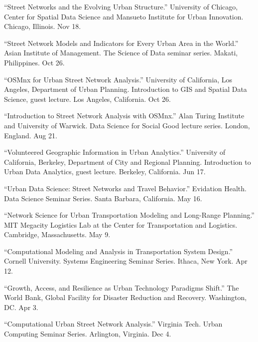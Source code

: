 \documentclass[11pt,letterpaper]{report} %
\begin{document}
\begin{tablist}
\item[2020] \tab{}\enquote{Street Networks and the Evolving Urban Structure.} University of Chicago, Center for Spatial Data Science and Mansueto Institute for Urban Innovation. Chicago, Illinois. Nov 18.

\item[2020] \tab{}\enquote{Street Network Models and Indicators for Every Urban Area in the World.} Asian Institute of Management. The Science of Data seminar series. Makati, Philippines. Oct 26.

\item[2020] \tab{}\enquote{OSMnx for Urban Street Network Analysis.} University of California, Los Angeles, Department of Urban Planning. Introduction to GIS and Spatial Data Science, guest lecture. Los Angeles, California. Oct 26.

\item[2020] \tab{}\enquote{Introduction to Street Network Analysis with OSMnx.} Alan Turing Institute and University of Warwick. Data Science for Social Good lecture series. London, England. Aug 21.

\item[2020] \tab{}\enquote{Volunteered Geographic Information in Urban Analytics.} University of California, Berkeley, Department of City and Regional Planning. Introduction to Urban Data Analytics, guest lecture. Berkeley, California. Jun 17.

\item[2019] \tab{}\enquote{Urban Data Science: Street Networks and Travel Behavior.} Evidation Health. Data Science Seminar Series. Santa Barbara, California. May 16.

\item[2019] \tab{}\enquote{Network Science for Urban Transportation Modeling and Long-Range Planning.} MIT Megacity Logistics Lab at the Center for Transportation and Logistics. Cambridge, Massachusetts. May 9.

\item[2019] \tab{}\enquote{Computational Modeling and Analysis in Transportation System Design.} Cornell University. Systems Engineering Seminar Series. Ithaca, New York. Apr 12.

\item[2019] \tab{}\enquote{Growth, Access, and Resilience as Urban Technology Paradigms Shift.} The World Bank, Global Facility for Disaster Reduction and Recovery. Washington, DC\@. Apr 3.

\item[2018] \tab{}\enquote{Computational Urban Street Network Analysis.} Virginia Tech. Urban Computing Seminar Series. Arlington, Virginia. Dec 4.


\end{tablist}
\end{document}
